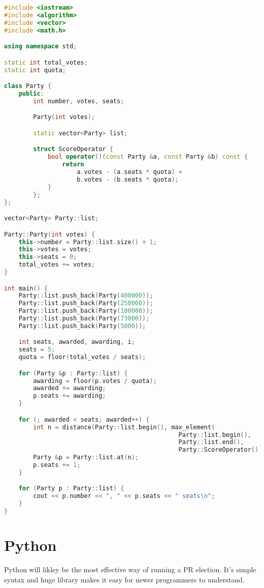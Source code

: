\documentclass{article}
\begin{document}
    \begin{lstlisting}[language=C++]
#include <iostream>
#include <algorithm>
#include <vector>
#include <math.h>

using namespace std;

static int total_votes;
static int quota;

class Party {
    public:
        int number, votes, seats;

        Party(int votes);

        static vector<Party> list;

        struct ScoreOperator {
            bool operator()(const Party &a, const Party &b) const {
                return
                    a.votes - (a.seats * quota) <
                    b.votes - (b.seats * quota);
            }
        };
};

vector<Party> Party::list;

Party::Party(int votes) {
    this->number = Party::list.size() + 1;
    this->votes = votes;
    this->seats = 0;
    total_votes += votes;
}

int main() {
    Party::list.push_back(Party(400000));
    Party::list.push_back(Party(250000));
    Party::list.push_back(Party(100000));
    Party::list.push_back(Party(73000));
    Party::list.push_back(Party(5000));

    int seats, awarded, awarding, i;
    seats = 5;
    quota = floor(total_votes / seats);

    for (Party &p : Party::list) {
        awarding = floor(p.votes / quota);
        awarded += awarding;
        p.seats += awarding;
    }

    for (; awarded < seats; awarded++) {
        int n = distance(Party::list.begin(), max_element(
                                                Party::list.begin(), 
                                                Party::list.end(), 
                                                Party::ScoreOperator()));
        Party &p = Party::list.at(n);
        p.seats += 1;
    }

    for (Party p : Party::list) {
        cout << p.number << ", " << p.seats << " seats\n";
    }
}

    \end{lstlisting}

    \section{Python}

    Python will likley be the most effective way of running a PR election. It's simple syntax and huge library makes it easy for newer programmers to understand.
\end{document}
